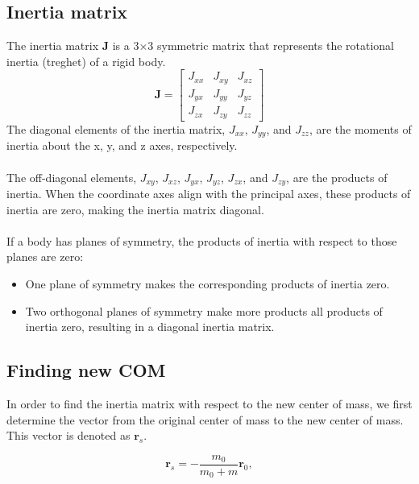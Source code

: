 \subsection{Inertia matrix}
The inertia matrix \textbf{J} is a 3×3 symmetric matrix that represents the rotational inertia (treghet) of a rigid body. 
\[
\mathbf{J} = \begin{bmatrix}
    J_{xx} & J_{xy} & J_{xz} \\
    J_{yx} & J_{yy} & J_{yz} \\
    J_{zx} & J_{zy} & J_{zz}
\end{bmatrix}
\]
The diagonal elements of the inertia matrix, \( J_{xx} \), \( J_{yy} \), and \( J_{zz} \), are the moments of inertia about the x, y, and z axes, respectively. 
\\
\\
The off-diagonal elements, \( J_{xy} \), \( J_{xz} \), \( J_{yx} \), \( J_{yz} \), \( J_{zx} \), and \( J_{zy} \), are the products of inertia. When the coordinate axes align with the principal axes, these products of inertia are zero, making the inertia matrix diagonal.
\\
\\
If a body has planes of symmetry, the products of inertia with respect to those planes are zero:
\begin{itemize}
    \item One plane of symmetry makes the corresponding products of inertia zero.
    \item Two orthogonal planes of symmetry make more products all products of inertia zero, resulting in a diagonal inertia matrix.
\end{itemize}

\subsection{Finding new COM}

In order to find the inertia matrix with respect to the new center of mass, we first determine the vector from the original center of mass to the new center of mass. This vector is denoted as $\mathbf{r}_s$.

\begin{equation}
    \mathbf{r}_s = -\frac{m_0}{m_0 + m} \mathbf{r}_0,
\end{equation}


